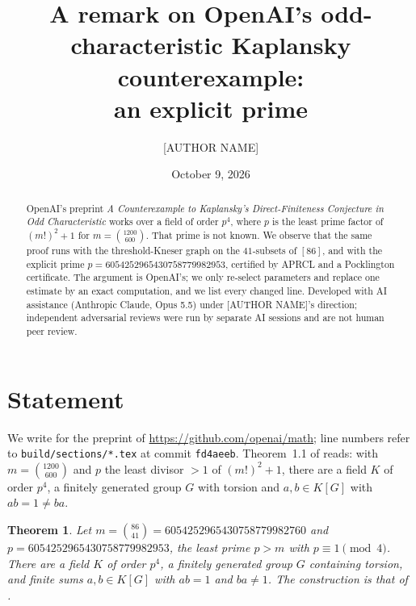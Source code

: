 \documentclass[11pt]{amsart}
\title{A remark on OpenAI's odd-characteristic Kaplansky counterexample:\\ an explicit prime}
\author{[AUTHOR NAME]}
\date{October 9, 2026}
\newtheorem{theorem}{Theorem}
\theoremstyle{remark}
\begin{document}
\begin{abstract}
OpenAI's preprint \emph{A Counterexample to Kaplansky's Direct-Finiteness Conjecture
in Odd Characteristic} works over a field of order $p^4$, where $p$ is the least prime
factor of $(m!)^2+1$ for $m=\binom{1200}{600}$. That prime is not known. We observe that the same
proof runs with the threshold-Kneser graph on the $41$-subsets of $[86]$, and with the
explicit prime $p=6054252965430758779982953$, certified by APRCL and a Pocklington
certificate. The argument is OpenAI's; we only re-select parameters and replace one
estimate by an exact computation, and we list every changed line. Developed with
AI assistance (Anthropic Claude, Opus 5.5) under [AUTHOR NAME]'s direction;
independent adversarial reviews were run by separate AI sessions and are not human
peer review.
\end{abstract}
\maketitle

\section{Statement}
We write \cite{OAI197} for the preprint
of \url{https://github.com/openai/math}; line numbers refer to \texttt{build/sections/*.tex} at commit
\texttt{fd4aeeb}. Theorem~1.1 of \cite{OAI197} reads: with $m=\binom{1200}{600}$ and $p$ the least
divisor $>1$ of $(m!)^2+1$, there are a field $K$ of order $p^4$, a finitely generated group $G$ with
torsion and $a,b\in K[G]$ with $ab=1\ne ba$.

\begin{theorem}\label{thm}
Let $m=\binom{86}{41}=6054252965430758779982760$ and $p=6054252965430758779982953$, the least prime
$p>m$ with $p\equiv1\pmod 4$. There are a field $K$ of order $p^4$, a finitely generated group $G$
containing torsion, and finite sums $a,b\in K[G]$ with $ab=1$ and $ba\neq1$. The construction is that
of \cite{OAI197}.
\end{theorem}
\end{document}
